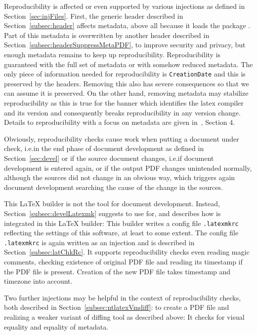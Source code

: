 Reproducibility is affected or even supported by various injections 
as defined in Section~\ref{sec:injFiles}. 
First, the generic header described in Section~\ref{subsec:header} 
affects metadata, above all because it loads the package . 
Part of this metadata is overwritten by another header 
described in Section~\ref{subsec:headerSuppressMetaPDF}, 
to improve security and privacy, 
but enough metadata remains to keep up reproducibility. 
Reproducibility is guaranteed with the full set of metadata 
or with somehow reduced metadata. 
The only piece of information needed for reproducibility is \texttt{CreationDate} 
and this is preserved by the headers. 
Removing this also has severe consequences 
so that we can assume it is preserved. 
On the other hand, removing metadata may stabilize reproducibility 
as this is true for the banner which identifies the latex compiler and its version 
and consequently breaks reproducibility in any version change. 
Details to reproducibility with a focus on metadata are given in~\cite{LatexGen}, Section 4. 

Obviously, reproducibility checks cause work 
when putting a document under check, 
i.e.\@ in the end phase of document development 
as defined in Section~\ref{sec:devel}
or if the source document changes, i.e.\@ if document development is entered again, 
or if the output PDF changes unintended 
normally, although the sources did not change in an obvious way, 
which triggers again document development searching the cause of the change in the sources. 

This \LaTeX{} builder is not the tool for document development. 
Instead, Section~\ref{subsec:develLatexmk} suggests to use  for, 
and describes how  is integrated in this \LaTeX{} builder: 
This builder writes a config file \texttt{.latexmkrc} 
reflecting the settings of this software, at least to some extent. 
The config file \texttt{.latexmkrc} is again written as an injection 
and is described in Section~\ref{subsec:latChkRc}. 
It supports reproducibility checks even reading magic comments, 
checking existence of original PDF file 
and reading its timestamp if the PDF file is present. 
Creation of the new PDF file takes timestamp and timezone into account. 

Two further injections may be helpful in the context of reproducibility checks, 
both described in Section~\ref{subsec:ntlatexVmdiff}: 
 to create a PDF file and  
realizing a weaker variant of diffing tool as described above: 
It checks for visual equality and equality of metadata. 
\medskip


